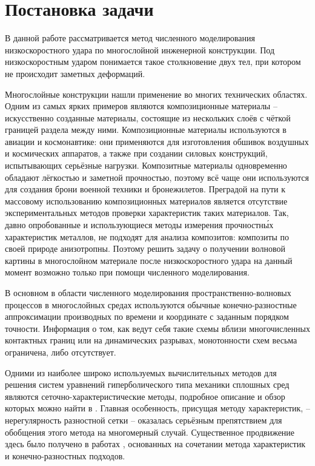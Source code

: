 \section{Постановка задачи}
В данной работе рассматривается метод численного моделирования низкоскоростного удара по многослойной инженерной конструкции. Под низкоскоростным ударом понимается такое столкновение двух тел, при котором не происходит заметных деформаций. 

Многослойные конструкции нашли применение во многих технических областях. Одним из самых ярких примеров являются композиционные материалы -- искусственно созданные  материалы, состоящие из нескольких слоёв с чёткой границей раздела между ними. Композиционные материалы используются в авиации и космонавтике: они применяются для изготовления обшивок воздушных и космических аппаратов, а также при создании силовых конструкций, испытывающих серьёзные нагрузки. Композитные материалы одновременно обладают лёгкостью и заметной прочностью, поэтому всё чаще они используются для создания брони военной техники и бронежилетов. Преградой на пути к массовому использованию композиционных материалов является отсутствие экспериментальных методов проверки характеристик таких материалов. Так, давно опробованные и использующиеся методы измерения прочностн\'{ы}х характеристик металлов, не подходят для анализа композитов: композиты по своей природе анизотропны. Поэтому решить задачу о получении волновой картины в многослойном материале после низкоскоростного удара на данный момент возможно только при помощи численного моделирования.

В основном в области численного моделирования пространственно-волновых процессов в многослойных средах используются обычные конечно-разностные аппроксимации производных по времени и координате с заданным порядком точности. Информация о том, как ведут себя такие схемы вблизи многочисленных контактных границ или на динамических разрывах, монотонности схем весьма ограничена, либо отсутствует.

Одними из наиболее широко используемых вычислительных методов для решения систем уравнений гиперболического типа механики сплошных сред являются сеточно-характеристические методы, подробное описание и обзор которых можно найти в \cite{magomedov}. Главная особенность, присущая методу характеристик, -- нерегулярность разностной сетки -- оказалась серьёзным препятствием для обобщения этого метода на многомерный случай. Существенное продвижение здесь было получено в работах \cite{chushkin}, основанных на сочетании метода характеристик и конечно-разностных подходов.

